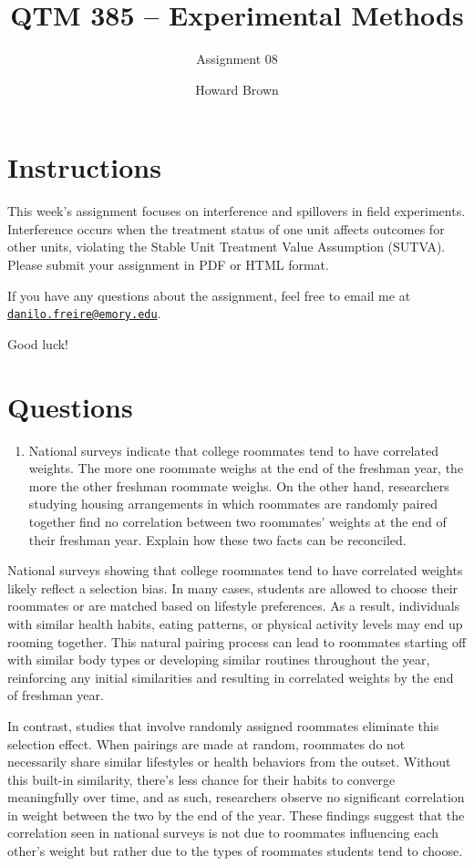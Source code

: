 \documentclass[
  letterpaper,
  DIV=11,
  numbers=noendperiod]{scrartcl}
\title{QTM 385 -- Experimental Methods}
\subtitle{Assignment 08}
\author{Howard Brown}
\date{}
\providecommand{\tightlist}{%
  \setlength{\itemsep}{0pt}\setlength{\parskip}{0pt}}\usepackage{longtable,booktabs,array}
\begin{document}
\maketitle


\section{Instructions}\label{instructions}

This week's assignment focuses on interference and spillovers in field
experiments. Interference occurs when the treatment status of one unit
affects outcomes for other units, violating the Stable Unit Treatment
Value Assumption (SUTVA). Please submit your assignment in PDF or HTML
format.

If you have any questions about the assignment, feel free to email me at
\href{mailto:danilo.freire@emory.edu}{\nolinkurl{danilo.freire@emory.edu}}.

Good luck!

\section{Questions}\label{questions}

\begin{enumerate}
\def\labelenumi{\arabic{enumi}.}
\tightlist
\item
  National surveys indicate that college roommates tend to have
  correlated weights. The more one roommate weighs at the end of the
  freshman year, the more the other freshman roommate weighs. On the
  other hand, researchers studying housing arrangements in which
  roommates are randomly paired together find no correlation between two
  roommates' weights at the end of their freshman year. Explain how
  these two facts can be reconciled.
\end{enumerate}

National surveys showing that college roommates tend to have correlated
weights likely reflect a selection bias. In many cases, students are
allowed to choose their roommates or are matched based on lifestyle
preferences. As a result, individuals with similar health habits, eating
patterns, or physical activity levels may end up rooming together. This
natural pairing process can lead to roommates starting off with similar
body types or developing similar routines throughout the year,
reinforcing any initial similarities and resulting in correlated weights
by the end of freshman year.

In contrast, studies that involve randomly assigned roommates eliminate
this selection effect. When pairings are made at random, roommates do
not necessarily share similar lifestyles or health behaviors from the
outset. Without this built-in similarity, there's less chance for their
habits to converge meaningfully over time, and as such, researchers
observe no significant correlation in weight between the two by the end
of the year. These findings suggest that the correlation seen in
national surveys is not due to roommates influencing each other's weight
but rather due to the types of roommates students tend to choose.
\end{document}

